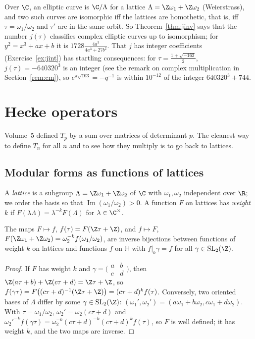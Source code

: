 Over $\C$, an elliptic curve is $\C/\Lambda$ for a lattice $\Lambda=\Z\omega_1+\Z\omega_2$ (Weierstrass), and two such curves are isomorphic iff the lattices are
homothetic, that is, iff $\tau=\omega_1/\omega_2$ and $\tau'$ are in the same orbit. So Theorem~\ref{thm:jinv} says that the number $j(\tau)$ classifies complex
elliptic curves up to isomorphism; for $y^2=x^3+ax+b$ it is $1728\frac{4a^3}{4a^3+27b^2}$. That $j$ has integer coefficients (Exercise~\ref{ex:jint}) has
startling consequences: for $\tau=\frac{1+\sqrt{-163}}2$, $j(\tau)=-640320^3$ is an integer (see the remark on complex multiplication in Section~\ref{rem:cm}), so $e^{\pi\sqrt{163}}=-q^{-1}$ is within $10^{-12}$ of the
integer $640320^3+744$.

\section{Hecke operators}

Volume~5 defined $T_p$ by a sum over matrices of determinant $p$. The cleanest way to define $T_n$ for all $n$ and to see how they multiply is to go back to lattices.

\subsection*{Modular forms as functions of lattices}

A \emph{lattice} is a subgroup $\Lambda=\Z\omega_1+\Z\omega_2$ of $\C$ with $\omega_1,\omega_2$ independent over $\R$; we order the basis so that
$\operatorname{Im}(\omega_1/\omega_2)>0$. A function $F$ on lattices has \emph{weight $k$} if $F(\lambda\Lambda)=\lambda^{-k}F(\Lambda)$ for $\lambda\in\C^\times$.

\begin{lemma}\label{lem:latticefn}
The maps $F\mapsto f$, $f(\tau)=F(\Z\tau+\Z)$, and $f\mapsto F$, $F(\Z\omega_1+\Z\omega_2)=\omega_2^{-k}f(\omega_1/\omega_2)$, are inverse bijections between
functions of weight $k$ on lattices and functions $f$ on $\mathbb H$ with $f|_k\gamma=f$ for all $\gamma\in\mathrm{SL}_2(\Z)$.
\end{lemma}
\begin{proof}
If $F$ has weight $k$ and $\gamma=\bigl(\begin{smallmatrix}a&b\\c&d\end{smallmatrix}\bigr)$, then $\Z(a\tau+b)+\Z(c\tau+d)=\Z\tau+\Z$, so
$f(\gamma\tau)=F\bigl((c\tau+d)^{-1}(\Z\tau+\Z)\bigr)=(c\tau+d)^kf(\tau)$. Conversely, two oriented bases of $\Lambda$ differ by some $\gamma\in\mathrm{SL}_2(\Z)$:
$(\omega_1',\omega_2')=(a\omega_1+b\omega_2,c\omega_1+d\omega_2)$. With $\tau=\omega_1/\omega_2$, $\omega_2'=\omega_2(c\tau+d)$ and
$\omega_2'^{-k}f(\gamma\tau)=\omega_2^{-k}(c\tau+d)^{-k}(c\tau+d)^kf(\tau)$, so $F$ is well defined; it has weight $k$, and the two maps are inverse.
\end{proof}

